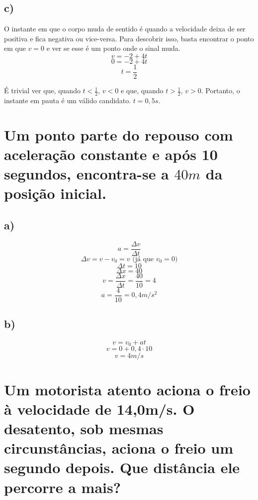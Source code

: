 \documentclass{article}
\begin{document}
    \subsection{c)}
        \hspace{\parindent}O instante em que o corpo muda de sentido é quando a velocidade deixa de ser positiva e fica negativa ou vice-versa. Para descobrir isso, basta encontrar o ponto em que \(v=0\) e ver se esse é um ponto onde o sinal muda.
        \[v=-2+4t\]
        \[0=-2+4t\]
        \[t=\frac{1}{2}\]
        \par É trivial ver que, quando \(t<\frac{1}{2}\), \(v<0\) e que, quando \(t>\frac{1}{2}\), \(v>0\). Portanto, o instante em pauta é um válido candidato. \(t = 0,5s\).

\section{Um ponto parte do repouso com aceleração constante e após 10 segundos, encontra-se a \(40m\) da posição inicial.}

    \subsection{a)}
        \[a=\frac{\Delta v}{\Delta t}\]
        \[\Delta v=v-v_0=v \textrm{ (já que \(v_0=0\))}\] 
        \[\Delta t = 10\]
        \[\Delta x = 40\]
        \[v=\frac{\Delta x}{\Delta t}=\frac{40}{10}=4\]
        \[a=\frac{4}{10}=0,4m/s^2\]
    
    \subsection{b)}
        \[v=v_0+at\]
        \[v=0+0,4\cdot 10\]
        \[v=4m/s\]

\section{Um motorista atento aciona o freio à velocidade de 14,0m/s. O desatento, sob mesmas circunstâncias, aciona o freio um segundo depois. Que distância ele percorre a mais?} 
\end{document}
